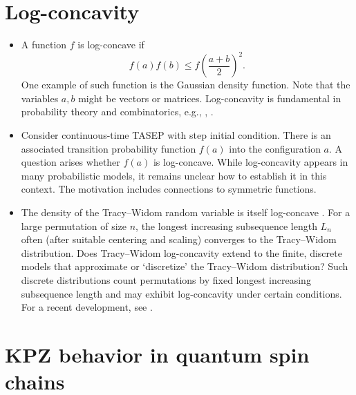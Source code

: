 \documentclass{article}
\theoremstyle{definition}
\begin{document}
\section{Log-concavity}



\begin{itemize}
\item A function $f$ is log-concave if
$$f(a)f(b) \leq f\left(\frac{a+b}{2}\right)^2.$$
One example of such function is the Gaussian density function.
Note that the variables $a,b$ might be vectors or matrices.
Log-concavity is fundamental in probability theory and combinatorics, e.g.,
\cite{bagnoli2005log},
\cite{huh2022logarithmic}.
		\item Consider continuous-time TASEP with step initial
			condition.  There is an associated transition
			probability function $f(a)$ into the configuration
			$a$.  A question arises whether $f(a)$ is log-concave.
			While log-concavity appears in many probabilistic
			models, it remains unclear how to establish it in this
			context.  The motivation includes connections to
			symmetric functions.

	\item The density of the
		Tracy--Widom random variable is itself log-concave \cite{bona2017longest}.
		For a large permutation of size $n$, the
		longest increasing subsequence length $L_n$ often (after
		suitable centering and scaling) converges to the
		Tracy--Widom distribution. Does
		Tracy--Widom log-concavity extend to the finite, discrete models
		that approximate or `discretize' the Tracy--Widom
		distribution?
		Such discrete distributions count
		permutations by fixed longest increasing subsequence length
		and may exhibit log-concavity under certain conditions.
		For a recent development, see \cite{baslingker2024log}.
\end{itemize}

\section{KPZ behavior in quantum spin chains}
\end{document}
